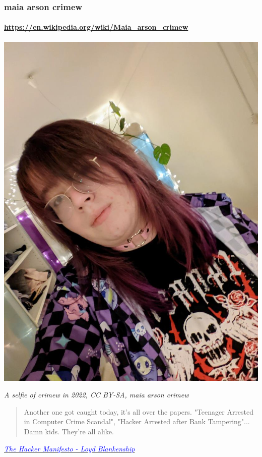 \documentclass[aspectratio=169,usenames,dvipsnames]{beamer}
\begin{document}
\begin{frame}[c]
  \frametitle{maia arson crimew}
  \framesubtitle{\url{https://en.wikipedia.org/wiki/Maia_arson_crimew}}

  \centering
  \includegraphics[width=\textwidth,height=0.7\textheight,keepaspectratio]{img/maia_arson_crimew.jpg}

  \footnotesize
  \emph{A selfie of crimew in 2022, CC BY-SA, maia arson crimew}

\end{frame}

\begin{frame}[c]

  \begin{quote}
    Another one got caught today, it's all over the papers.
    "Teenager Arrested in Computer Crime Scandal", "Hacker Arrested after Bank
    Tampering"...\\Damn kids. They're all alike.
  \end{quote}

  \vspace{5mm}

  \centering
  \footnotesize
  \emph{\href{https://en.wikisource.org/wiki/The_Hacker_Manifesto}{\textcolor{blue}{The Hacker Manifesto - Loyd Blankenship}}}

\end{frame}
\end{document}
